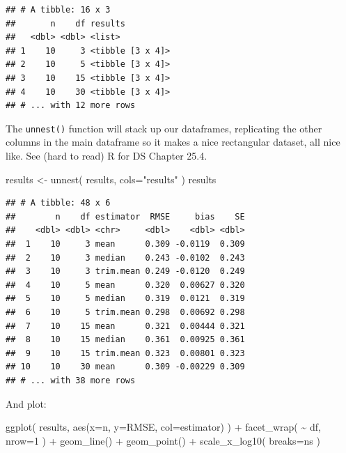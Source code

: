 \documentclass[
]{book}
\newenvironment{Shaded}{\begin{snugshade}}{\end{snugshade}}
\newcommand{\AttributeTok}[1]{\textcolor[rgb]{0.77,0.63,0.00}{#1}}
\newcommand{\DecValTok}[1]{\textcolor[rgb]{0.00,0.00,0.81}{#1}}
\newcommand{\FunctionTok}[1]{\textcolor[rgb]{0.00,0.00,0.00}{#1}}
\newcommand{\NormalTok}[1]{#1}
\newcommand{\OtherTok}[1]{\textcolor[rgb]{0.56,0.35,0.01}{#1}}
\newcommand{\SpecialCharTok}[1]{\textcolor[rgb]{0.00,0.00,0.00}{#1}}
\newcommand{\StringTok}[1]{\textcolor[rgb]{0.31,0.60,0.02}{#1}}
\begin{document}
\begin{verbatim}
## # A tibble: 16 x 3
##       n    df results         
##   <dbl> <dbl> <list>          
## 1    10     3 <tibble [3 x 4]>
## 2    10     5 <tibble [3 x 4]>
## 3    10    15 <tibble [3 x 4]>
## 4    10    30 <tibble [3 x 4]>
## # ... with 12 more rows
\end{verbatim}

The \texttt{unnest()} function will stack up our dataframes, replicating the other columns in the main dataframe so it makes a nice rectangular dataset, all nice like. See (hard to read) R for DS Chapter 25.4.

\begin{Shaded}
\begin{Highlighting}[]
\NormalTok{results }\OtherTok{\textless{}{-}} \FunctionTok{unnest}\NormalTok{( results, }\AttributeTok{cols=}\StringTok{"results"}\NormalTok{ )}
\NormalTok{results}
\end{Highlighting}
\end{Shaded}

\begin{verbatim}
## # A tibble: 48 x 6
##        n    df estimator  RMSE     bias    SE
##    <dbl> <dbl> <chr>     <dbl>    <dbl> <dbl>
##  1    10     3 mean      0.309 -0.0119  0.309
##  2    10     3 median    0.243 -0.0102  0.243
##  3    10     3 trim.mean 0.249 -0.0120  0.249
##  4    10     5 mean      0.320  0.00627 0.320
##  5    10     5 median    0.319  0.0121  0.319
##  6    10     5 trim.mean 0.298  0.00692 0.298
##  7    10    15 mean      0.321  0.00444 0.321
##  8    10    15 median    0.361  0.00925 0.361
##  9    10    15 trim.mean 0.323  0.00801 0.323
## 10    10    30 mean      0.309 -0.00229 0.309
## # ... with 38 more rows
\end{verbatim}

And plot:

\begin{Shaded}
\begin{Highlighting}[]
\FunctionTok{ggplot}\NormalTok{( results, }\FunctionTok{aes}\NormalTok{(}\AttributeTok{x=}\NormalTok{n, }\AttributeTok{y=}\NormalTok{RMSE, }\AttributeTok{col=}\NormalTok{estimator) ) }\SpecialCharTok{+}
            \FunctionTok{facet\_wrap}\NormalTok{( }\SpecialCharTok{\textasciitilde{}}\NormalTok{ df, }\AttributeTok{nrow=}\DecValTok{1}\NormalTok{ ) }\SpecialCharTok{+}
            \FunctionTok{geom\_line}\NormalTok{() }\SpecialCharTok{+} \FunctionTok{geom\_point}\NormalTok{() }\SpecialCharTok{+}
            \FunctionTok{scale\_x\_log10}\NormalTok{( }\AttributeTok{breaks=}\NormalTok{ns )}
\end{Highlighting}
\end{Shaded}
\end{document}
